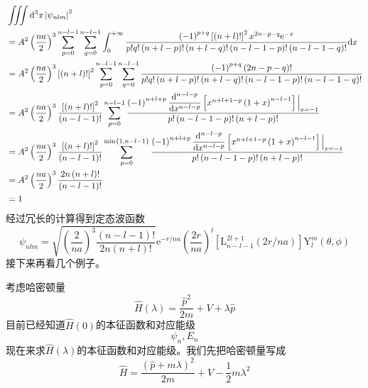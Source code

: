 \documentclass[12pt, a4paper, oneside]{ctexart}
\begin{document}
	\begin{align}
		&\iiint\mathrm{d}^{3}x\left|\psi_{nlm}\right|^{2}\\&=A^{2}\left(\dfrac{na}{2}\right)^{3}\sum_{p=0}^{n-l-1}\sum_{q=0}^{n-l-1}\int_{0}^{+\infty}\dfrac{\left(-1\right)^{p+q}\left[\left(n+l\right)!\right]^{2}x^{2n-p-q}\mathrm{e}^{-x}}{p!q!\left(n+l-p\right)!\left(n+l-q\right)!\left(n-l-1-p\right)!\left(n-l-1-q\right)!}\mathrm{d}x\\
		&=A^{2}\left(\dfrac{na}{2}\right)^{3}\left[\left(n+l\right)!\right]^{2}\sum_{p=0}^{n-l-1}\sum_{q=0}^{n-l-1}\dfrac{\left(-1\right)^{p+q}\left(2n-p-q\right)!}{p!q!\left(n+l-p\right)!\left(n+l-q\right)!\left(n-l-1-p\right)!\left(n-l-1-q\right)!}\\
		&=A^{2}\left(\dfrac{na}{2}\right)^{3}\dfrac{\left[\left(n+l\right)!\right]^{2}}{\left(n-l-1\right)!}\sum_{p=0}^{n-l-1}\dfrac{\left(-1\right)^{n+l+p}\dfrac{\mathrm{d}^{n-l-p}}{\mathrm{d}x^{n-l-p}}\left[x^{n+l+1-p}\left(1+x\right)^{n-l-1}\right]\Big{|}_{x=-1}}{p!\left(n-l-1-p\right)!\left(n+l-p\right)!}\\		&=A^{2}\left(\dfrac{na}{2}\right)^{3}\dfrac{\left[\left(n+l\right)!\right]^{2}}{\left(n-l-1\right)!}\sum_{p=0}^{\min\left\{1,n-l-1\right\}}\dfrac{\left(-1\right)^{n+l+p}\dfrac{\mathrm{d}^{n-l-p}}{\mathrm{d}x^{n-l-p}}\left[x^{n+l+1-p}\left(1+x\right)^{n-l-1}\right]\Big{|}_{x=-1}}{p!\left(n-l-1-p\right)!\left(n+l-p\right)!}\\
		&=A^{2}\left(\dfrac{na}{2}\right)^{3}\dfrac{2n\left(n+l\right)!}{\left(n-l-1\right)!}\\
		&=1
	\end{align}
	\quad\quad 经过冗长的计算得到定态波函数
	\begin{equation}
		\psi_{nlm}=\sqrt{\left(\frac{2}{n a}\right)^{3} \frac{(n-l-1)!}{2 n(n+l)!}} \mathrm{e}^{-r / n a}\left(\frac{2 r}{n a}\right)^{l}\left[\mathrm{L}_{n-l-1}^{2 l+1}(2 r / n a)\right] \mathrm{Y}_{l}^{m}(\theta, \phi)
	\end{equation}
	\quad\quad 接下来再看几个例子。\par 
	考虑哈密顿量
	\begin{equation}
		\hat{H}(\lambda)=\dfrac{\hat{p}^{2}}{2m}+V+\lambda\hat{p}
	\end{equation}
	\quad\quad 目前已经知道$\hat{H}(0)$的本征函数和对应能级
	\begin{equation}
		\psi_{n},E_{n}
	\end{equation}
	\quad\quad 现在来求$\hat{H}(\lambda)$的本征函数和对应能级。我们先把哈密顿量写成
	\begin{equation}
		\hat{H}=\dfrac{\left(\hat{p}+m\lambda\right)^{2}}{2m}+V-\dfrac{1}{2}m\lambda^{2}
	\end{equation}
\end{document}
